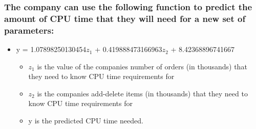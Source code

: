 \documentclass[]{article}
\providecommand{\tightlist}{%
  \setlength{\itemsep}{0pt}\setlength{\parskip}{0pt}}
\begin{document}
\hypertarget{the-company-can-use-the-following-function-to-predict-the-amount-of-cpu-time-that-they-will-need-for-a-new-set-of-parameters}{%
\subsubsection{The company can use the following function to predict the
amount of CPU time that they will need for a new set of
parameters:}\label{the-company-can-use-the-following-function-to-predict-the-amount-of-cpu-time-that-they-will-need-for-a-new-set-of-parameters}}

\begin{itemize}
\tightlist
\item
  y = 1.07898250130454\(z_1\) + 0.419888473166963\(z_2\) +
  8.42368896741667

  \begin{itemize}
  \tightlist
  \item
    \(z_1\) is the value of the companies number of orders (in
    thousands) that they need to know CPU time requirements for
  \item
    \(z_2\) is the companies add-delete items (in thousands) that they
    need to know CPU time requirements for
  \item
    y is the predicted CPU time needed.
  \end{itemize}
\end{itemize}
\end{document}
